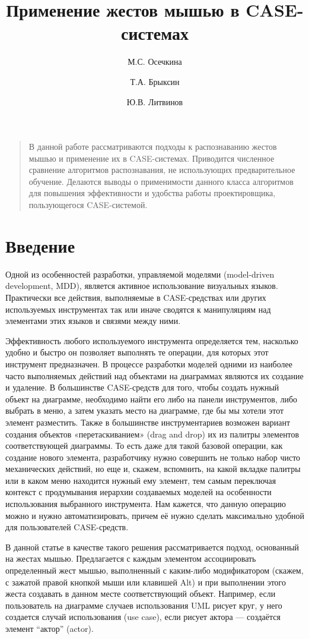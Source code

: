 \documentclass[a5paper]{article}
\title{Применение жестов мышью в CASE-системах}
\author{М.С. Осечкина \and Т.А. Брыксин \and Ю.В. Литвинов}
\date{}
\begin{document}
\maketitle
\thispagestyle{empty}

\begin{quote}
\small\noindent
В данной работе рассматриваются подходы к распознаванию жестов мышью и применение их в CASE-системах. Приводится численное сравнение алгоритмов распознавания, не использующих предварительное обучение. Делаются выводы о применимости данного класса алгоритмов для повышения эффективности и удобства работы проектировщика, пользующегося CASE-системой.
\end{quote}

\section*{Введение}
Одной из особенностей разработки, управляемой моделями (model-driven development, MDD), является активное использование визуальных языков. Практически все действия, выполняемые в CASE-средствах или других используемых инструментах так или иначе сводятся к манипуляциям над элементами этих языков и связями между ними. 

Эффективность любого используемого инструмента определяется тем, насколько удобно и быстро он позволяет выполнять те операции, для которых этот инструмент предназначен. В процессе разработки моделей одними из наиболее часто выполняемых действий над объектами на диаграммах являются их создание и удаление.  В большинстве CASE-средств для того, чтобы создать нужный объект на диаграмме, необходимо найти его либо на панели инструментов, либо выбрать в меню, а затем указать место на диаграмме, где бы мы хотели этот элемент разместить. Также в большинстве инструментариев возможен вариант создания объектов «перетаскиванием» (drag and drop) их из палитры элементов соответствующей диаграммы. То есть даже для такой базовой операции, как создание нового элемента, разработчику нужно совершить не только набор чисто механических действий, но еще и, скажем, вспомнить, на какой вкладке палитры или в каком меню находится нужный ему элемент, тем самым переключая контекст с продумывания иерархии создаваемых моделей на особенности использования выбранного инструмента. Нам кажется, что данную операцию можно и нужно автоматизировать, причем её нужно сделать максимально удобной для пользователей CASE-средств. 

В данной статье в качестве такого решения рассматривается подход, основанный на жестах мышью. Предлагается с каждым элементом ассоциировать определенный жест мышью, выполненный с каким-либо модификатором (скажем, с зажатой правой кнопкой мыши или клавишей Alt) и при выполнении этого жеста создавать в данном месте соответствующий объект. Например, если пользователь на диаграмме случаев использования UML рисует круг, у него создается случай использования (use case), если рисует актора --- создаётся элемент ``актор'' (actor).
\end{document}
